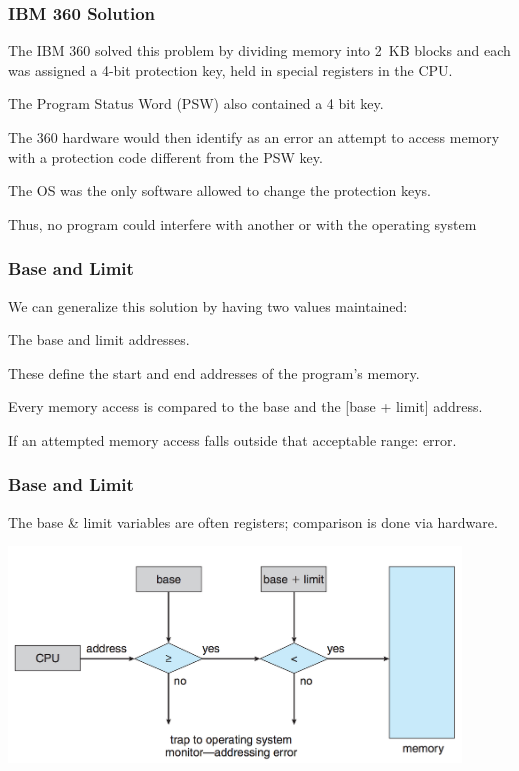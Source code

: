 \begin{frame}
\frametitle{IBM 360 Solution}

 The IBM 360 solved this problem by dividing memory into 2~KB blocks and each was assigned a 4-bit protection key, held in special registers in the CPU. 
 
The Program Status Word (PSW) also contained a 4 bit key. 

The 360 hardware would then identify as an error an attempt to access memory with a protection code different from the PSW key. 

The OS was the only software allowed to change the protection keys. 

Thus, no program could interfere with another or with the operating system


\end{frame}

\begin{frame}
\frametitle{Base and Limit}

We can generalize this solution by having two values maintained: 

The \alert{base} and \alert{limit} addresses. 

These define the start and end addresses of the program's memory.

Every memory access is compared to the base and the [base + limit] address. 

If an attempted memory access falls outside that acceptable range: error. 

\end{frame}

\begin{frame}
\frametitle{Base and Limit}

The base \& limit variables are often registers; comparison is done via hardware.

\begin{center}
\includegraphics[width=0.9\textwidth]{images/memory-baselimit.png}
\end{center}


\end{frame}

